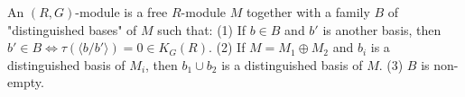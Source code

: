 An $(R, G)$-module is a free $R$-module $M$ together with a family $B$ of "distinguished bases" of $M$ such that:
(1) If $b \in B$ and $b'$ is another basis, then $b' \in B \Leftrightarrow \tau(\langle b/b' \rangle) = 0 \in K_G(R)$.
(2) If $M = M_1 \oplus M_2$ and $b_i$ is a distinguished basis of $M_i$, then $b_1 \cup b_2$ is a distinguished basis of $M$.
(3) $B$ is non-empty.
